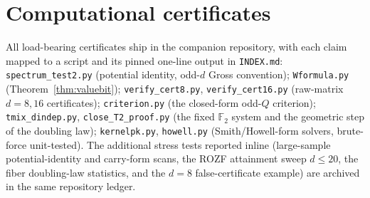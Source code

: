 \documentclass[11pt]{article}
\theoremstyle{remark}
\newcommand{\F}{\mathbb{F}}
\begin{document}
\appendix
\section{Computational certificates}
All load-bearing certificates ship in the companion repository, with each claim mapped to a script and
its pinned one-line output in \texttt{INDEX.md}:
\texttt{spectrum\_test2.py} (potential identity, odd-$d$ Gross convention);
\texttt{Wformula.py} (Theorem~\ref{thm:valuebit});
\texttt{verify\_cert8.py}, \texttt{verify\_cert16.py} (raw-matrix $d=8,16$ certificates);
\texttt{criterion.py} (the closed-form odd-$Q$ criterion);
\texttt{tmix\_dindep.py}, \texttt{close\_T2\_proof.py} (the fixed $\F_2$ system and the geometric step
of the doubling law); \texttt{kernelpk.py}, \texttt{howell.py} (Smith/Howell-form solvers,
brute-force unit-tested). The additional stress tests reported inline (large-sample potential-identity
and carry-form scans, the ROZF attainment sweep $d\le 20$, the fiber doubling-law statistics, and the
$d=8$ false-certificate example) are archived in the same repository ledger.
\end{document}
